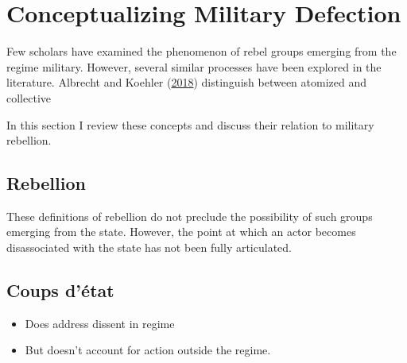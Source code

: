 \documentclass[12pt,]{article}
\providecommand{\tightlist}{%
  \setlength{\itemsep}{0pt}\setlength{\parskip}{0pt}}
\begin{document}
\hypertarget{conceptualizing-military-defection}{%
\section{Conceptualizing Military Defection}\label{conceptualizing-military-defection}}

Few scholars have examined the phenomenon of rebel groups emerging from the regime military. However, several similar processes have been explored in the literature. Albrecht and Koehler (\protect\hyperlink{ref-Albrecht2018}{2018}) distinguish between atomized and collective

In this section I review these concepts and discuss their relation to military rebellion.

\hypertarget{rebellion}{%
\subsection{Rebellion}\label{rebellion}}

These definitions of rebellion do not preclude the possibility of such groups emerging from the state. However, the point at which an actor becomes disassociated with the state has not been fully articulated.

\hypertarget{coups-duxe9tat}{%
\subsection{Coups d'état}\label{coups-duxe9tat}}

\begin{itemize}
\tightlist
\item
  Does address dissent in regime
\item
  But doesn't account for action outside the regime.
\end{itemize}
\end{document}
